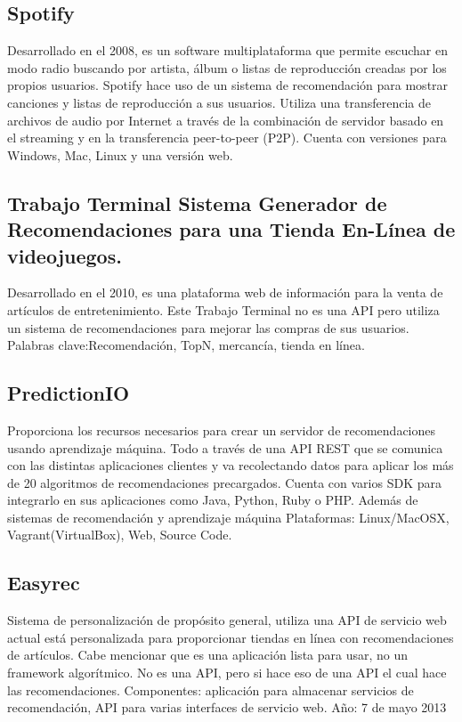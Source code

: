   \subsection {Spotify}
    Desarrollado en el 2008, es un software multiplataforma que permite escuchar en modo radio buscando por artista, álbum o listas de reproducción creadas por los propios usuarios. Spotify hace uso de un sistema de recomendación para mostrar canciones y listas de reproducción a sus usuarios. Utiliza una transferencia de archivos de audio por Internet a través de la combinación de servidor basado en el streaming y en la transferencia peer-to-peer (P2P). Cuenta con versiones para Windows, Mac, Linux y una versión web. \cite{4}

  \subsection{Trabajo Terminal Sistema Generador de Recomendaciones para una Tienda En-Línea de videojuegos.} 
    Desarrollado en el 2010, es una plataforma web de información para la venta de artículos de entretenimiento. Este Trabajo Terminal no es una API pero utiliza un sistema de recomendaciones para mejorar las compras de sus usuarios. Palabras clave:Recomendación, TopN, mercancía, tienda en línea.\cite{5}

  \subsection{PredictionIO}
    Proporciona los recursos necesarios para crear un servidor de recomendaciones usando aprendizaje máquina. Todo a través de una API REST que se comunica con las distintas aplicaciones clientes y va recolectando datos para aplicar los más de 20 algoritmos de recomendaciones precargados. Cuenta con varios SDK para integrarlo en sus aplicaciones como Java, Python, Ruby o PHP. Además de sistemas de recomendación y aprendizaje máquina Plataformas: Linux/MacOSX, Vagrant(VirtualBox), Web, Source Code.\cite{6}

  \subsection{Easyrec}
    Sistema de personalización de propósito general, utiliza una API de servicio web actual está personalizada para proporcionar tiendas en línea con recomendaciones de artículos. Cabe mencionar que es una aplicación lista para usar, no un framework algorítmico. No es una API, pero si hace eso de una API el cual hace las recomendaciones. Componentes: aplicación para almacenar servicios de recomendación, API para varias interfaces de servicio web. Año: 7 de mayo 2013\cite{7}

